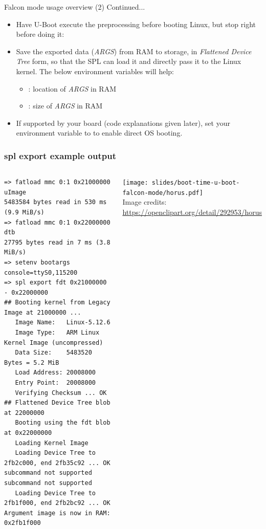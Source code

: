 \begin{frame}{Falcon mode usage overview (2)}
   Continued...
   \begin{itemize}
     \item Have U-Boot execute the preprocessing before booting Linux,
           but stop right before doing it:\\
     \item Save the exported data ({\em ARGS}) from RAM to storage, in {\em Flattened Device
	   Tree} form, so that the SPL can load it and directly pass it to
           the Linux kernel. The below environment variables will help:
	   \begin{itemize}
		\item {}: location of {\em ARGS} in RAM
		\item {}: size of {\em ARGS} in RAM
	   \end{itemize}
     \item If supported by your board (code explanations given later),
	   set your  environment variable to 
           to enable direct OS booting.
   \end{itemize}
\end{frame}

\begin{frame}[fragile]
\frametitle{spl export example output}
  \begin{columns}
  \begin{block}{}
  \scriptsize
  \begin{verbatim}
=> fatload mmc 0:1 0x21000000 uImage
5483584 bytes read in 530 ms (9.9 MiB/s)
=> fatload mmc 0:1 0x22000000 dtb
27795 bytes read in 7 ms (3.8 MiB/s)
=> setenv bootargs console=ttyS0,115200
=> spl export fdt 0x21000000 - 0x22000000
## Booting kernel from Legacy Image at 21000000 ...
   Image Name:   Linux-5.12.6
   Image Type:   ARM Linux Kernel Image (uncompressed)
   Data Size:    5483520 Bytes = 5.2 MiB
   Load Address: 20008000
   Entry Point:  20008000
   Verifying Checksum ... OK
## Flattened Device Tree blob at 22000000
   Booting using the fdt blob at 0x22000000
   Loading Kernel Image
   Loading Device Tree to 2fb2c000, end 2fb35c92 ... OK
subcommand not supported
subcommand not supported
   Loading Device Tree to 2fb1f000, end 2fb2bc92 ... OK
Argument image is now in RAM: 0x2fb1f000
  \end{verbatim}
  \end{block}
    \begin{center}
    \vspace{0.5cm}
    \texttt{[image: slides/boot-time-u-boot-falcon-mode/horus.pdf]}\\
    \vspace{0.5cm}
    \tiny Image credits:\\
    \url{https://openclipart.org/detail/292953/horus}
    \end{center}
  \end{columns}
\end{frame}

